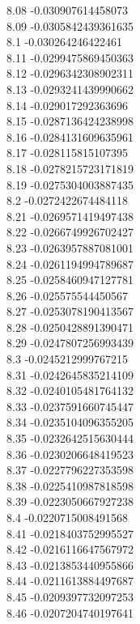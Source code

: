 {8.08	-0.030907614458073\\
8.09	-0.0305842439361635\\
8.1	-0.030264246422461\\
8.11	-0.0299475869450363\\
8.12	-0.0296342308902311\\
8.13	-0.0293241439990662\\
8.14	-0.029017292363696\\
8.15	-0.0287136424238998\\
8.16	-0.0284131609635961\\
8.17	-0.028115815107395\\
8.18	-0.0278215723171819\\
8.19	-0.0275304003887435\\
8.2	-0.0272422674484118\\
8.21	-0.0269571419497438\\
8.22	-0.0266749926702427\\
8.23	-0.0263957887081001\\
8.24	-0.0261194994789687\\
8.25	-0.0258460947127781\\
8.26	-0.025575544450567\\
8.27	-0.0253078190413567\\
8.28	-0.0250428891390471\\
8.29	-0.0247807256993439\\
8.3	-0.0245212999767215\\
8.31	-0.0242645835214109\\
8.32	-0.0240105481764132\\
8.33	-0.0237591660745447\\
8.34	-0.0235104096355205\\
8.35	-0.0232642515630444\\
8.36	-0.0230206648419523\\
8.37	-0.0227796227353598\\
8.38	-0.0225410987818598\\
8.39	-0.0223050667927238\\
8.4	-0.0220715008491568\\
8.41	-0.0218403752995527\\
8.42	-0.0216116647567972\\
8.43	-0.0213853440955866\\
8.44	-0.0211613884497687\\
8.45	-0.0209397732097253\\
8.46	-0.0207204740197641\\
}
